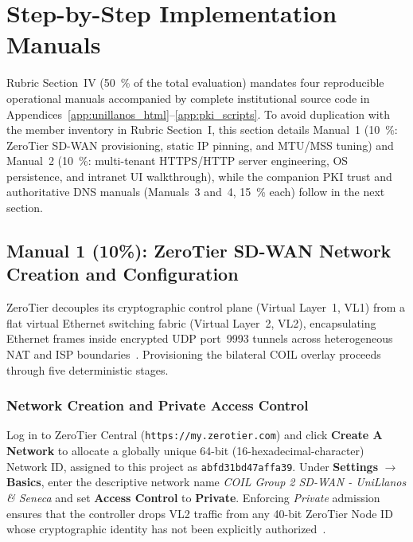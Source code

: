 \section{Step-by-Step Implementation Manuals}
\label{sec:manuals}

Rubric Section~IV (\qty{50}{\percent} of the total evaluation) mandates four reproducible operational manuals accompanied by complete institutional source code in Appendices~\ref{app:unillanos_html}--\ref{app:pki_scripts}. To avoid duplication with the member inventory in Rubric Section~I, this section details Manual~1 (\qty{10}{\percent}: ZeroTier SD-WAN provisioning, static IP pinning, and MTU/MSS tuning) and Manual~2 (\qty{10}{\percent}: multi-tenant HTTPS/HTTP server engineering, OS persistence, and intranet UI walkthrough), while the companion PKI trust and authoritative DNS manuals (Manuals~3 and~4, \qty{15}{\percent} each) follow in the next section.

\subsection{Manual 1 (10\%): ZeroTier SD-WAN Network Creation and Configuration}
\label{subsec:manual1_sdwan}

ZeroTier decouples its cryptographic control plane (Virtual Layer~1, VL1) from a flat virtual Ethernet switching fabric (Virtual Layer~2, VL2), encapsulating Ethernet frames inside encrypted UDP port~9993 tunnels across heterogeneous NAT and ISP boundaries~\cite{zerotier2024,tanenbaum2021,kurose2017}. Provisioning the bilateral COIL overlay proceeds through five deterministic stages.

\subsubsection{Network Creation and Private Access Control}
Log in to ZeroTier Central (\nolinkurl{https://my.zerotier.com}) and click \textbf{Create A Network} to allocate a globally unique 64-bit (16-hexadecimal-character) Network ID, assigned to this project as \texttt{abfd31bd47affa39}. Under \textbf{Settings} $\rightarrow$ \textbf{Basics}, enter the descriptive network name \textit{COIL Group 2 SD-WAN - UniLlanos \& Seneca} and set \textbf{Access Control} to \textbf{Private}. Enforcing \textit{Private} admission ensures that the controller drops VL2 traffic from any 40-bit ZeroTier Node ID whose cryptographic identity has not been explicitly authorized~\cite{zerotier2024}.

